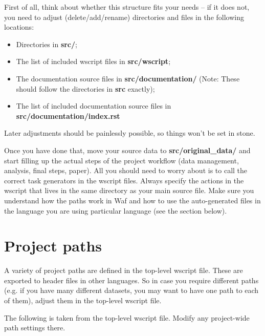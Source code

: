 \documentclass[a4paper,11pt,english]{sphinxmanual}
\begin{document}
First of all, think about whether this structure fits your needs -- if it does not, you need to adjust (delete/add/rename) directories and files in the following locations:
\begin{itemize}
\item {} 
Directories in \textbf{src/};

\item {} 
The list of included wscript files in \textbf{src/wscript};

\item {} 
The documentation source files in \textbf{src/documentation/} (Note: These should follow the directories in \textbf{src} exactly);

\item {} 
The list of included documentation source files in \textbf{src/documentation/index.rst}

\end{itemize}

Later adjustments should be painlessly possible, so things won't be set in stone.

Once you have done that, move your source data to \textbf{src/original\_data/} and start filling up the actual steps of the project workflow (data management, analysis, final steps, paper). All you should need to worry about is to call the correct task generators in the wscript files. Always specify the actions in the wscript that lives in the same directory as your main source file. Make sure you understand how the paths work in Waf and how to use the auto-generated files in the language you are using particular language (see the section {\hyperref[introduction:project\string-paths]{}} below).


\section{Project paths}
\label{introduction:id5}\label{introduction:project-paths}
A variety of project paths are defined in the top-level wscript file. These are exported to header files in other languages. So in case you require different paths (e.g. if you have many different datasets, you may want to have one path to each of them), adjust them in the top-level wscript file.

The following is taken from the top-level wscript file. Modify any project-wide path settings there.
\end{document}
